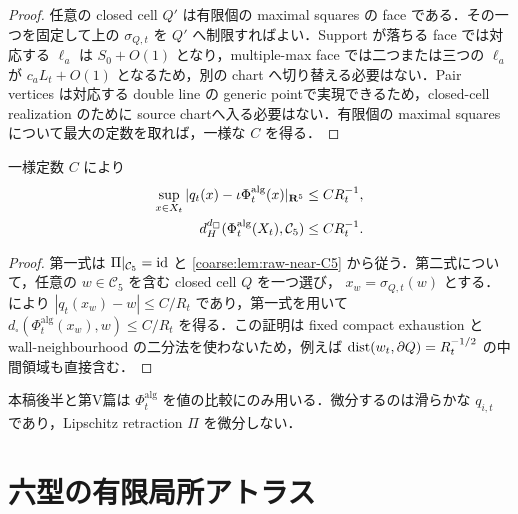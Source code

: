 \documentclass[a4paper,11pt]{ltjsarticle}
\numberwithin{equation}{section}
\theoremstyle{plain}
\theoremstyle{definition}
\theoremstyle{remark}
\newcommand{\Cfive}{\mathcal C_5}\newcommand{\dsq}{d_{\square}}\newcommand{\Lt}{L_t}\newcommand{\Rt}{R_t}
\begin{document}
\begin{proof}
任意の closed cell $Q'$ は有限個の maximal squares の face である．その一つを固定して上の $\sigma_{Q,t}$ を $Q'$ へ制限すればよい．Support が落ちる face では対応する $\ell_a$ は $S_0+O(1)$ となり，multiple-max face では二つまたは三つの $\ell_a$ が $c_aL_t+O(1)$ となるため，別の chart へ切り替える必要はない．Pair vertices は対応する double line の generic pointで実現できるため，closed-cell realization のために source chartへ入る必要はない．有限個の maximal squaresについて最大の定数を取れば，一様な $C$ を得る．
\end{proof}

\begin{corollary}\label{coarse:cor:uniform-image-density}
一様定数 $C$ により
\begin{align}
 \sup_{x\in X_t}|q_t(x)-\iota\Phi_t^{\mathrm{alg}}(x)|_{\RR^5}
 &\le CR_t^{-1},\label{coarse:eq:value-close}\\
 d_H^{d_\square}(\Phi_t^{\mathrm{alg}}(X_t),\Cfive)
 &\le CR_t^{-1}.\label{coarse:eq:image-density}
\end{align}
\end{corollary}

\begin{proof}
第一式は $\Pi|_{\Cfive}=\id$ と \cref{coarse:lem:raw-near-C5} から従う．第二式について，任意の $w\in\Cfive$ を含む closed cell $Q$ を一つ選び，
$x_w=\sigma_{Q,t}(w)$ とする． により
$|q_t(x_w)-w|\le C/R_t$ であり，第一式を用いて
$d_\square(\Phi_t^{\mathrm{alg}}(x_w),w)\le C/R_t$ を得る．この証明は fixed compact exhaustion と wall-neighbourhood の二分法を使わないため，例えば
$\operatorname{dist}(w_t,\partial Q)=R_t^{-1/2}$ の中間領域も直接含む．
\end{proof}

\begin{remark}\label{coarse:rem:no-diff-Pi}
本稿後半と第V篇は $\Phi_t^{\mathrm{alg}}$ を値の比較にのみ用いる．微分するのは滑らかな $q_{i,t}$ であり，Lipschitz retraction $\Pi$ を微分しない．
\end{remark}

\section{六型の有限局所アトラス}\label{coarse:sec:atlas}
\end{document}
